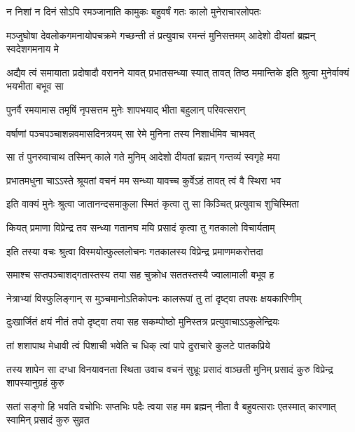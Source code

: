 \twolineshloka
{न निशां न दिनं सोऽपि रमञ्जानाति कामुकः}
{बहुवर्षं गतः कालो मुनेराचारलोपतः}%

\threelineshloka
{मञ्जुघोषा देवलोकगमनायोपचक्रमे}
{गच्छन्ती तं प्रत्युवाच रमन्तं मुनिसत्तमम्}
{आदेशो दीयतां ब्रह्मन् स्वदेशगमनाय मे}%


\threelineshloka
{अद्यैव त्वं समायाता प्रदोषादौ वरानने}
{यावत् प्रभातसन्ध्या स्यात् तावत् तिष्ठ ममान्तिके}
{इति श्रुत्वा मुनेर्वाक्यं भयभीता बभूव सा}%

\twolineshloka
{पुनर्वै रमयामास तमृषिं नृपसत्तम}
{मुनेः शापभयाद् भीता बहुलान् परिवत्सरान्}%

\twolineshloka
{वर्षाणां पञ्चपञ्चाशन्नवमासदिनत्रयम्}
{सा रेमे मुनिना तस्य निशार्धमिव चाभवत्}%

\twolineshloka
{सा तं पुनरुवाचाथ तस्मिन् काले गते मुनिम्}
{आदेशो दीयतां ब्रह्मन् गन्तव्यं स्वगृहे मया}%


\twolineshloka
{प्रभातमधुना चाऽऽस्ते श्रूयतां वचनं मम}
{सन्ध्या यावच्च कुर्वेऽहं तावत् त्वं वै स्थिरा भव}%

\twolineshloka
{इति वाक्यं मुनेः श्रुत्वा जातानन्दसमाकुला}
{स्मितं कृत्वा तु सा किञ्चित् प्रत्युवाच शुचिस्मिता}%


\twolineshloka
{कियत् प्रमाणा विप्रेन्द्र तव सन्ध्या गतानघ}
{मयि प्रसादं कृत्वा तु गतकालो विचार्यताम्}%

\twolineshloka
{इति तस्या वचः श्रुत्वा विस्मयोत्फुल्ललोचनः}
{गतकालस्य विप्रेन्द्र प्रमाणमकरोत्तदा}%

\twolineshloka
{समाश्च सप्तपञ्चाशद्गतास्तस्य तया सह}
{चुक्रोध सततस्तस्यै ज्वालामाली बभूव ह}%

\twolineshloka
{नेत्राभ्यां विस्फुलिङ्गान् स मुञ्चमानोऽतिकोपनः}
{कालरूपां तु तां दृष्ट्वा तपसः क्षयकारिणीम्}%

\twolineshloka
{दुःखार्जितं क्षयं नीतं तपो दृष्ट्वा तया सह}
{सकम्पोष्ठो मुनिस्तत्र प्रत्युवाचाऽऽकुलेन्द्रियः}%

\twolineshloka
{तां शशापाथ मेधावी त्वं पिशाची भवेति च}
{धिक् त्वां पापे दुराचारे कुलटे पातकप्रिये}%

\threelineshloka
{तस्य शापेन सा दग्धा विनयावनता स्थिता}
{उवाच वचनं सुभ्रूः प्रसादं वाञ्छती मुनिम्}
{प्रसादं कुरु विप्रेन्द्र शापस्यानुग्रहं कुरु}%

\threelineshloka
{सतां सङ्गो हि भवति वचोभिः सप्तभिः पदैः}
{त्वया सह मम ब्रह्मन् नीता वै बहुवत्सराः}
{एतस्मात् कारणात् स्वामिन् प्रसादं कुरु सुव्रत}%

